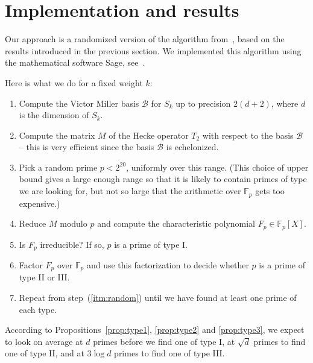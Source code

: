 \documentclass[11pt]{article}
\theoremstyle{plain}
\theoremstyle{definition}
\theoremstyle{remark}
\numberwithin{equation}{section}
\newcommand{\FF}{\mathbb{F}}
\newcommand{\cB}{\mathcal{B}}
\begin{document}
\section{Implementation and results}
Our approach is a randomized version of the algorithm
from~\cite{ConreyFarmer}, based on the results introduced in the previous
section.  We implemented this algorithm using the mathematical software Sage, 
see~\cite{Sage}.

Here is what we do for a fixed weight $k$:
\begin{enumerate}
  \item\label{itm:vmbasis} Compute the Victor Miller basis $\cB$ for $S_k$ up to precision
    $2(d+2)$, where $d$ is the dimension of $S_k$.
  \item\label{itm:hecke} Compute the matrix $M$ of the Hecke operator $T_2$ with respect to the
    basis $\cB$ -- this is very efficient since the basis $\cB$ is
    echelonized.
  \item\label{itm:random} Pick a random prime $p<2^{20}$, uniformly over this
    range.  (This choice of upper
    bound gives a large enough range so that it is likely to contain primes of
    type we are looking for, but not so large that the arithmetic over $\FF_p$
    gets too expensive.)
  \item Reduce $M$ modulo $p$ and compute the characteristic polynomial
    $F_p\in \FF_p[X]$.
  \item Is $F_p$ irreducible?  If so, $p$ is a prime of type I.
  \item Factor $F_p$ over $\FF_p$ and use this factorization to decide whether
    $p$ is a prime of type II or III.
  \item Repeat from step~(\ref{itm:random}) until we have found at
    least one prime of each type.
\end{enumerate}

According to Propositions~\ref{prop:type1}, \ref{prop:type2} and
\ref{prop:type3}, we expect to look on average at $d$ primes before we find
one of type I, at $\sqrt{d}$ primes to find one of type II, and at $3\log d$
primes to find one of type III.
\end{document}
